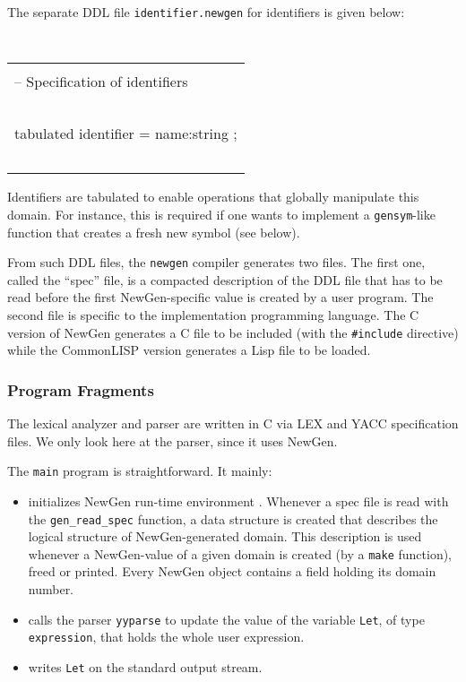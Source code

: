 The separate DDL file {\tt identifier.newgen} for identifiers is given
below:

{\tt
\begin{center}
\begin{tabular}{|l|}
\hline \\
-- Specification of identifiers \\
~\\
tabulated identifier = name:string ; \\
~\\
\hline
\end{tabular}
\end{center}
}

Identifiers are tabulated to enable operations that globally manipulate
this domain. For instance, this is required if one wants to implement a
{\tt gensym}-like function that creates a fresh new symbol (see below).

From such DDL files, the {\tt newgen} compiler generates two files. The
first one, called the ``spec'' file, is a compacted description of the
DDL file that has to be read before the first NewGen-specific value is
created by a user program. The second file is specific to the
implementation programming language. The C version of NewGen generates a
C file to be included (with the {\tt \#include} directive) while the
CommonLISP version generates a Lisp file to be loaded.

\subsubsection*{Program Fragments}

The lexical analyzer and parser are written in C via LEX and YACC
specification files. We only look here at the parser, since it uses
NewGen.

The {\tt main} program is straightforward. It mainly:
\begin{itemize}
\item
	initializes NewGen run-time environment . Whenever a spec file
is read with the {\tt gen\_read\_spec} function, a data structure is
created that describes the logical structure of NewGen-generated domain.
This description is used whenever a NewGen-value of a given domain is
created (by a {\tt make} function), freed or printed. Every NewGen
object contains a field holding its domain number.
\item
	calls the parser {\tt yyparse} to update the value of the
variable {\tt Let}, of type {\tt expression}, that holds the whole user
expression.
\item
	writes {\tt Let} on the standard output stream.
\end{itemize}

